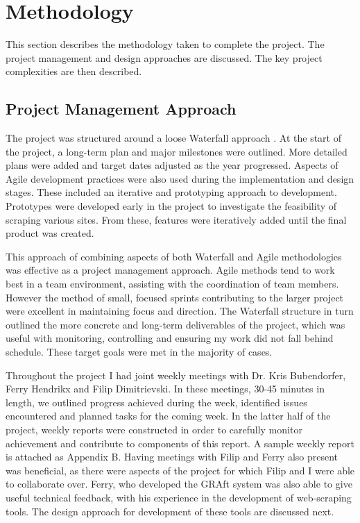 \chapter{Methodology}\label{C:meth}

This section describes the methodology taken to complete the project. The project management and design approaches are discussed. The key project complexities are then described. 

\section{Project Management Approach}



The project was structured around a loose Waterfall approach \cite{waterfall}. At the start of the project, a long-term plan and major milestones were outlined. More detailed plans were added and target dates adjusted as the year progressed. Aspects of Agile development practices were also used during the implementation and design stages. These included an iterative and prototyping approach to development. Prototypes were developed early in the project to investigate the feasibility of scraping various sites. From these, features were iteratively added until the final product was created.

This approach of combining aspects of both Waterfall and Agile methodologies was effective as a project management approach. Agile methods tend to work best in a team environment, assisting with the coordination of team members. However the method of small, focused sprints contributing to the larger project were excellent in maintaining focus and direction. The Waterfall structure in turn outlined the more concrete and long-term deliverables of the project, which was useful with monitoring, controlling and ensuring my work did not fall behind schedule. These target goals were met in the majority of cases.

Throughout the project I had joint weekly meetings with Dr. Kris Bubendorfer,  Ferry Hendrikx and Filip Dimitrievski. In these meetings, 30-45 minutes in length, we outlined progress achieved during the week, identified issues encountered and planned tasks for the coming week. In the latter half of the project, weekly reports were constructed in order to carefully monitor achievement and contribute to components of this report. A sample weekly report is attached as Appendix B. Having meetings with Filip and Ferry also present was beneficial, as there were aspects of the project for which Filip and I were able to collaborate over. Ferry, who developed the GRAft system was also able to give useful technical feedback, with his experience in the development of web-scraping tools. The design approach for development of these tools are discussed next.

